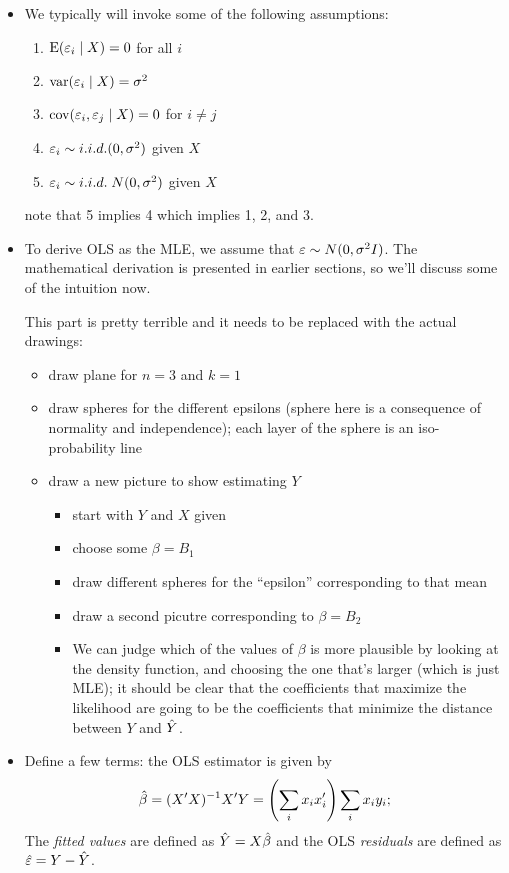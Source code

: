 \begin{itemize}
\item We typically will invoke some of the following assumptions:
  \begin{enumerate}
  \item $\operatorname{E}(\varepsilon_i \mid X) = 0$ for all $i$
  \item $\operatorname{var}(\varepsilon_i \mid X) = \sigma^2$
  \item $\operatorname{cov}(\varepsilon_i, \varepsilon_j \mid X) = 0$ for $i \neq j$
  \item $\varepsilon_i \sim i.i.d.(0,\sigma^2)$ given $X$
  \item $\varepsilon_i \sim i.i.d.\; N(0,\sigma^2)$ given $X$
  \end{enumerate}
  note that 5 implies 4 which implies 1, 2, and 3.

\item To derive OLS as the MLE, we assume that $\varepsilon \sim N(0,\sigma^2 I)$.
  The mathematical derivation is presented in earlier sections, so
  we'll discuss some of the intuition now.

  This part is pretty terrible and it needs to be replaced with the
  actual drawings:
  \begin{itemize}
  \item draw plane for $n = 3$ and $k = 1$
  \item draw spheres for the different epsilons (sphere here is a
    consequence of normality and independence); each layer of the
    sphere is an iso-probability line
  \item draw a new picture to show estimating $Y$
    \begin{itemize}
    \item start with $Y$ and $X$ given
    \item choose some $\beta = B_1$
    \item draw different spheres for the ``epsilon'' corresponding to that mean
    \item draw a second picutre corresponding to $\beta = B_2$
    \item We can judge which of the values of $\beta$ is more plausible by
      looking at the density function, and choosing the one that's
      larger (which is just MLE); it should be clear that the
      coefficients that maximize the likelihood are going to be the
      coefficients that minimize the distance between $Y$ and $\hat{Y}$.
    \end{itemize}
  \end{itemize}

\item Define a few terms: the OLS estimator is given by
  \begin{equation*}
    \hat{\beta} = (X'X)^{-1}X'Y = \left(\sum_i x_i x_i'\right) \sum_i x_i y_i;
  \end{equation*}
  The \emph{fitted values} are defined as $\hat{Y} = X \hat{\beta}$ and the OLS
  \emph{residuals} are defined as $\hat{\varepsilon} = Y - \hat{Y}$.


\end{itemize}
